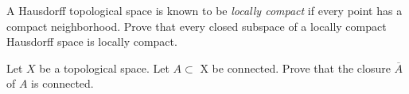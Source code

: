 \documentclass[12pt]{exam}
\theoremstyle{definition}
\begin{document}
\begin{questions}




\question

A Hausdorff topological space is known to be \emph{locally compact} if every point has a compact neighborhood.
Prove that every closed subspace of a locally compact Hausdorff space is locally compact.



\question

Let $X$ be a topological space. Let $A \subset$ X be connected. Prove that the closure $\overline{A}$ of $A$ is
connected.




\question





\end{questions}
\end{document}
